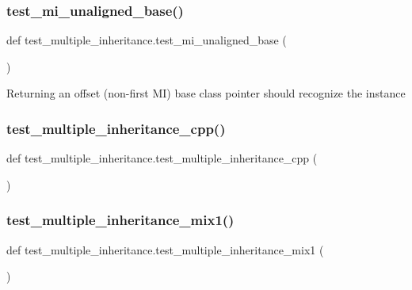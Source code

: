 \subsubsection{\texorpdfstring{test\_mi\_unaligned\_base()}{test\_mi\_unaligned\_base()}}
{\footnotesize\ttfamily def test\+\_\+multiple\+\_\+inheritance.\+test\+\_\+mi\+\_\+unaligned\+\_\+base (\begin{DoxyParamCaption}{ }\end{DoxyParamCaption})}

\begin{DoxyVerb}Returning an offset (non-first MI) base class pointer should recognize the instance\end{DoxyVerb}
 \mbox{\label{namespacetest__multiple__inheritance_ae51113ccaa1d6e777f30ef047f488289}} 
\subsubsection{\texorpdfstring{test\_multiple\_inheritance\_cpp()}{test\_multiple\_inheritance\_cpp()}}
{\footnotesize\ttfamily def test\+\_\+multiple\+\_\+inheritance.\+test\+\_\+multiple\+\_\+inheritance\+\_\+cpp (\begin{DoxyParamCaption}{ }\end{DoxyParamCaption})}

\mbox{\label{namespacetest__multiple__inheritance_a9ebd5c05b4eb435f7e9e206612b576c7}} 
\subsubsection{\texorpdfstring{test\_multiple\_inheritance\_mix1()}{test\_multiple\_inheritance\_mix1()}}
{\footnotesize\ttfamily def test\+\_\+multiple\+\_\+inheritance.\+test\+\_\+multiple\+\_\+inheritance\+\_\+mix1 (\begin{DoxyParamCaption}{ }\end{DoxyParamCaption})}

